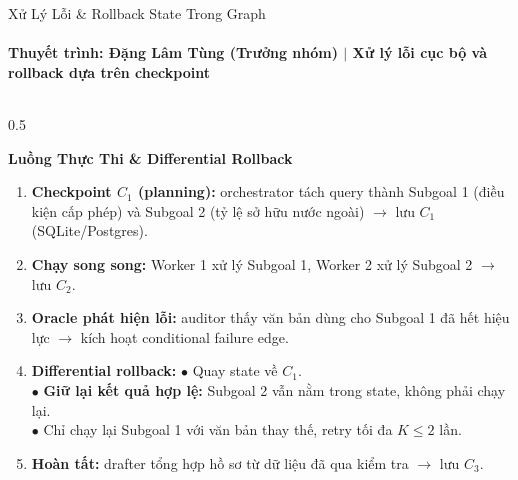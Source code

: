 \documentclass[aspectratio=1610,10pt,xcolor={table}]{beamer}
\begin{document}
\begin{frame}{Xử Lý Lỗi \& Rollback State Trong Graph}
  \framesubtitle{Thuyết trình: Đặng Lâm Tùng (Trưởng nhóm) $\vert$ Xử lý lỗi cục bộ và rollback dựa trên checkpoint}

  \begin{columns}[t]
    \begin{column}{0.5\textwidth}
      \begin{block}{\textbf{Luồng Thực Thi \& Differential Rollback}}
        \footnotesize
        \begin{enumerate}\scriptsize
          \item \textbf{Checkpoint $C_1$ (planning):} orchestrator tách query thành Subgoal 1 (điều kiện cấp phép) và Subgoal 2 (tỷ lệ sở hữu nước ngoài) $\to$ lưu $C_1$ (SQLite/Postgres).
          \item \textbf{Chạy song song:} Worker 1 xử lý Subgoal 1, Worker 2 xử lý Subgoal 2 $\to$ lưu $C_2$.
          \item \textbf{Oracle phát hiện lỗi:} auditor thấy văn bản dùng cho Subgoal 1 đã hết hiệu lực $\to$ kích hoạt conditional failure edge.
          \item \textbf{Differential rollback:}
                $\bullet$ Quay state về $C_1$.\\
                $\bullet$ \textbf{Giữ lại kết quả hợp lệ:} Subgoal 2 vẫn nằm trong state, không phải chạy lại.\\
                $\bullet$ Chỉ chạy lại Subgoal 1 với văn bản thay thế, retry tối đa $K \le 2$ lần.
          \item \textbf{Hoàn tất:} drafter tổng hợp hồ sơ từ dữ liệu đã qua kiểm tra $\to$ lưu $C_3$.
        \end{enumerate}
      \end{block}
    \end{column}


\end{columns}
\end{frame}
\end{document}
